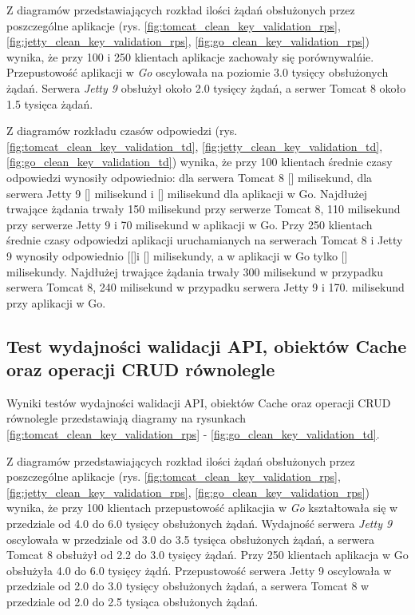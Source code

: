 Z diagramów przedstawiających rozkład ilości żądań obsłużonych przez poszczególne aplikacje  (rys. \ref{fig:tomcat_clean_key_validation_rps}, \ref{fig:jetty_clean_key_validation_rps}, \ref{fig:go_clean_key_validation_rps}) wynika, że przy 100 i 250 klientach aplikacje zachowały się  porównywalńie. Przepustowość aplikacji w \textsl{Go} oscylowała na poziomie 3.0 tysięcy obsłużonych żądań. Serwera \textsl{Jetty 9} obsłużył około 2.0 tysięcy  żądań, a serwer Tomcat 8 około 1.5 tysięca żądań.


Z diagramów rozkładu czasów odpowiedzi (rys. \ref{fig:tomcat_clean_key_validation_td}, \ref{fig:jetty_clean_key_validation_td}, \ref{fig:go_clean_key_validation_td}) wynika, że przy 100 klientach średnie czasy odpowiedzi wynosiły odpowiednio: dla serwera Tomcat 8 [] milisekund, dla serwera Jetty 9 [] milisekund i [] milisekund dla aplikacji w Go.  Najdłużej trwające żądania trwały 150 milisekund przy serwerze Tomcat 8, 110 milisekund przy serwerze  Jetty 9 i 70 milisekund  w aplikacji w Go. Przy 250 klientach średnie czasy odpowiedzi aplikacji uruchamianych na serwerach Tomcat 8 i Jetty 9  wynosiły odpowiednio [[]i [] milisekundy, a w aplikacji w Go tylko [] milisekundy. Najdłużej trwające żądania trwały 300 milisekund w przypadku serwera Tomcat 8, 240 milisekund w przypadku serwera Jetty 9 i 170. milisekund przy aplikacji w Go. 


\clearpage

\subsection{Test wydajności walidacji API, obiektów Cache oraz operacji CRUD równolegle }

Wyniki testów wydajności walidacji API, obiektów Cache oraz operacji CRUD równolegle przedstawiają diagramy na rysunkach \ref{fig:tomcat_clean_key_validation_rps} - \ref{fig:go_clean_key_validation_td}.              

Z diagramów przedstawiających rozkład ilości żądań obsłużonych przez poszczególne aplikacje  (rys. \ref{fig:tomcat_clean_key_validation_rps}, \ref{fig:jetty_clean_key_validation_rps}, \ref{fig:go_clean_key_validation_rps}) wynika, że przy 100 klientach przepustowość aplikacjia w \textsl{Go} kształtowała się w przedziale od 4.0 do 6.0 tysięcy obsłużonych żądań. Wydajność serwera \textsl{Jetty 9} oscylowała w przedziale od 3.0 do 3.5 tysięca obsłużonych żądań, a  serwera Tomcat 8 obsłużył od 2.2 do 3.0 tysięcy żądań. Przy 250 klientach aplikacja w Go obsłużyła 4.0 do 6.0 tysięcy żądń. Przepustowość serwera Jetty 9 oscylowała w przedziale od 2.0 do 3.0 tysięcy obsłużonych żądań, a serwera Tomcat 8 w przedziale od 2.0 do 2.5 tysiąca obsłużonych żądań.


